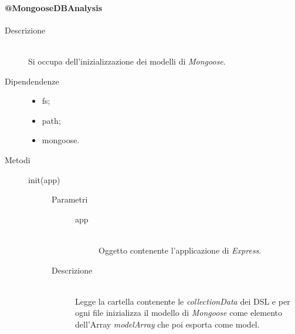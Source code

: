 \paragraph{@MongooseDBAnalysis}
\begin{description}
 \item[Descrizione] \hfill \\
 Si occupa dell'inizializzazione dei modelli di \textit{Mongoose}.
 \item[Dipendendenze] \hfill
    \begin{itemize}
    \item fs;
    \item path;
    \item mongoose.
    \end{itemize}
\item[Metodi] \hfill
 \begin{description}
 \item[init(app)] \hfill 
 \begin{description}
     		\item[Parametri] \hfill
     			\begin{description}
     				\item[app] \hfill \\
     				Oggetto contenente l'applicazione di \textit{Express}.
     			\end{description}
     		\item[Descrizione] \hfill \\
     		 Legge la cartella contenente le \textit{collectionData} dei DSL e per ogni file inizializza il modello di \textit{Mongoose} come elemento dell'Array \textit{modelArray} che poi esporta come model.
     	\end{description}

 \end{description}
\end{description}

